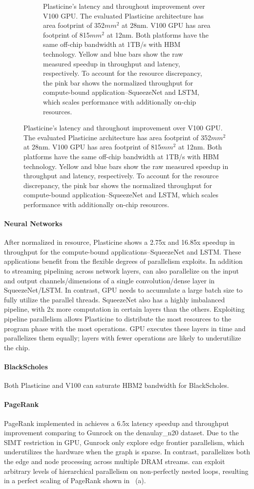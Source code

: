 \begin{figure}
\begin{figure}[H]
\caption[Performance comparison with a Tesla V100 GPU]{
  Plasticine's latency and throughout improvement over V100 GPU.
  The evaluated Plasticine architecture has area footprint of 352$mm^2$ at 28nm.
  V100 GPU has area footprint of 815$mm^2$ at 12nm.
  Both platforms have the same off-chip bandwidth at 1TB/s with HBM technology.
  Yellow and blue bars show the raw measured speedup in throughput and latency, respectively.
  To account for the resource discrepancy, the pink bar shows the normalized throughput
  for compute-bound application--SqueezeNet and LSTM, which scales performance with additionally
  on-chip resources.
}
\label{fig:speedup}
\end{figure}
\end{figure}

\paragraph{Neural Networks} 
After normalized in resource, Plasticine shows a 2.75x and 16.85x speedup in throughput for the
compute-bound applications--SqueezeNet and LSTM.
These applications benefit from the flexible degrees of parallelism \name{} exploits. 
In addition to streaming pipelining across network layers, \name can also parallelize on the
input and output channels/dimensions of a single convolution/dense layer in SqueezeNet/LSTM.
In contrast, GPU needs to accumulate a large batch size to fully utilize the parallel threads.
SqueezeNet also has a highly imbalanced pipeline, with 2x more computation in certain layers than
the others.
Exploiting pipeline parallelism allows Plasticine to distribute the most resources to the program
phase with the most operations.
GPU executes these layers in time and parallelizes them equally; 
layers with fewer operations are likely to underutilize the chip.

\paragraph{BlackScholes} 
Both Plasticine and V100 can saturate HBM2 bandwidth for BlackScholes.

\paragraph{PageRank} 
PageRank implemented in \name achieves a 6.5x latency speedup and throughput improvement comparing
to Gunrock \cite{gunrock} on the denaulay\_n20 \cite{delaunayn20} dataset. 
Due to the SIMT restriction in GPU, Gunrock only explore edge frontier parallelism, 
which underutilizes the hardware when the graph is sparse.
In contrast, \name{} parallelizes both the edge and node processing across multiple DRAM streams.
\name can exploit arbitrary levels of hierarchical parallelism on non-perfectly nested loops,
resulting in a perfect scaling of PageRank shown in~ (a).

